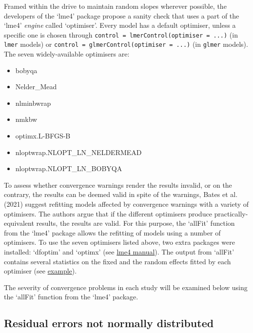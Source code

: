 \documentclass[
  12pt,
  man,floatsintext]{apa7}
\providecommand{\tightlist}{%
  \setlength{\itemsep}{0pt}\setlength{\parskip}{0pt}}
\begin{document}
Framed within the drive to maintain random slopes wherever possible, the developers of the `lme4' package propose a sanity check that uses a part of the `lme4' \emph{engine} called `optimiser'. Every model has a default optimiser, unless a specific one is chosen through \texttt{control\ =\ lmerControl(optimiser\ =\ \textquotesingle{}...\textquotesingle{})} (in \texttt{lmer} models) or \texttt{control\ =\ glmerControl(optimiser\ =\ \textquotesingle{}...\textquotesingle{})} (in \texttt{glmer} models). The seven widely-available optimisers are:

\begin{itemize}
\tightlist
\item
  bobyqa
\item
  Nelder\_Mead
\item
  nlminbwrap
\item
  nmkbw
\item
  optimx.L-BFGS-B
\item
  nloptwrap.NLOPT\_LN\_NELDERMEAD
\item
  nloptwrap.NLOPT\_LN\_BOBYQA
\end{itemize}

To assess whether convergence warnings render the results invalid, or on the contrary, the results can be deemed valid in spite of the warnings, Bates et al. (2021) suggest refitting models affected by convergence warnings with a variety of optimisers. The authors argue that if the different optimisers produce practically-equivalent results, the results are valid. For this purpose, the `allFit' function from the `lme4' package allows the refitting of models using a number of optimisers. To use the seven optimisers listed above, two extra packages were installed: `dfoptim' and `optimx' (see \href{https://cran.r-project.org/web/packages/lme4/lme4.pdf}{lme4 manual}). The output from `allFit' contains several statistics on the fixed and the random effects fitted by each optimiser (see \href{https://github.com/lme4/lme4/issues/512\#issue-425198940}{example}).

The severity of convergence problems in each study will be examined below using the `allFit' function from the `lme4' package.

\hypertarget{residual-errors-not-normally-distributed}{%
\subsection{Residual errors not normally distributed}\label{residual-errors-not-normally-distributed}}
\end{document}
